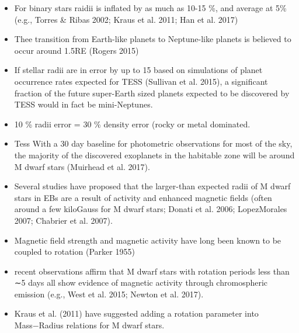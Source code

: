 \iffalse
\begin{itemize}




\item For binary stars raidii is inflated by as much as 10-15 \%, and average at 5\% (e.g., Torres \& Ribas 2002; Kraus et al. 2011;
Han et al. 2017)

\item Thee transition from Earth-like planets to
Neptune-like planets is believed to occur around 1.5RE (Rogers 2015)

\item If stellar radii are in error by up to 15%
based on simulations of planet occurrence rates expected for TESS (Sullivan et al. 2015), a significant fraction of the future super-Earth sized planets expected to be discovered by TESS would in fact be mini-Neptunes.

\item 10 \% radii error = 30 \% density error (rocky or metal dominated.

\item Tess With a 30 day baseline for photometric
observations for most of the sky, the majority of
the discovered exoplanets in the habitable zone will be around M dwarf stars (Muirhead et al. 2017).
\item Several studies have proposed that the larger-than expected radii of M dwarf stars in EBs are a result of activity and enhanced magnetic fields (often around a few kiloGauss for M dwarf stars; Donati et al. 2006; LopezMorales 2007; Chabrier et al. 2007).

\item Magnetic field
strength and magnetic activity have long been known to
be coupled to rotation (Parker 1955)

\item recent observations affirm that M dwarf stars with rotation periods less than ∼5 days all show evidence of magnetic activity through chromospheric emission (e.g., West et al. 2015; Newton et al. 2017).

\item Kraus et al. (2011) have suggested adding a rotation parameter into Mass−Radius relations for M dwarf stars.


\end{itemize}
